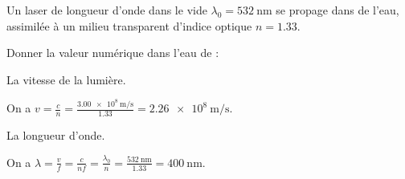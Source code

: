 	Un laser de longueur d'onde dans le vide $\lambda_0=\SI{532}{\nano\meter}$ se propage dans de l'eau, assimilée à un milieu transparent d'indice optique $n=\num{1,33}$. 
	
	Donner la valeur numérique dans l'eau de :
	
	\debutEntrainement
	
	
	
	
	\begin{enonce}
		La vitesse de la lumière.
	\end{enonce}
	
	
	\begin{corrige}
		On a $v=\frac{c}{n}=\frac{\SI{3.00e8}{\meter\per\second}}{\num{1.33}}=\SI{2.26e8}{\meter\per\second}$.
	\end{corrige}
	
	
	
	\begin{enonce}
		La longueur d'onde.
	\end{enonce}
	
	
	\begin{corrige}
		On a $\lambda=\frac{v}{f}=\frac{c}{nf}=\frac{\lambda_0}{n}=\frac{\SI{532}{\nano\meter}}{\num{1,33}}=\SI{400}{\nano\meter}$.
	\end{corrige}
	
	\finEntrainement
	

	
	
	\afficheReponsesMelangees
	
